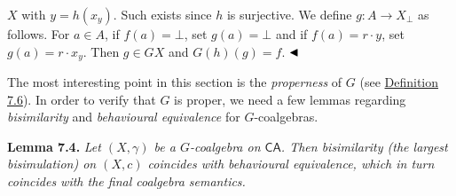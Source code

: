 \hypertarget{html:S7.SS0.SSS0.P0.SPx2.p2.m4}{}\({X}\) with %
\hypertarget{html:S7.SS0.SSS0.P0.SPx2.p2.m5}{}\({y=h(x_{y})}\). Such exists since %
\hypertarget{html:S7.SS0.SSS0.P0.SPx2.p2.m6}{}\({h}\) is surjective. We define %
\hypertarget{html:S7.SS0.SSS0.P0.SPx2.p2.m7}{}\({g\colon A\to X_{\bot}}\) as follows. For %
\hypertarget{html:S7.SS0.SSS0.P0.SPx2.p2.m8}{}\({a\in A}\), if %
\hypertarget{html:S7.SS0.SSS0.P0.SPx2.p2.m9}{}\({f(a)=\bot}\), set %
\hypertarget{html:S7.SS0.SSS0.P0.SPx2.p2.m10}{}\({g(a)=\bot}\) and if %
\hypertarget{html:S7.SS0.SSS0.P0.SPx2.p2.m11}{}\({f(a)=r\cdot y}\), set %
\hypertarget{html:S7.SS0.SSS0.P0.SPx2.p2.m12}{}\({g(a)=r\cdot x_{y}}\). Then %
\hypertarget{html:S7.SS0.SSS0.P0.SPx2.p2.m13}{}\({g\in GX}\) and %
\hypertarget{html:S7.SS0.SSS0.P0.SPx2.p2.m14}{}\({G(h)(g)=f}\). %
\hypertarget{html:S7.SS0.SSS0.P0.SPx2.p2.m15}{}\({\hfill\blacktriangleleft}\)
\par\medskip
\hypertarget{html:S7.SS0.SSS0.P0.SPx2.p3}{} The most interesting point in this section is the \emph{properness} of %
\hypertarget{html:S7.SS0.SSS0.P0.SPx2.p3.m1}{}\({G}\) (see \hyperlink{html:S7.Thmtheorem6}{Definition 7.6}). In order to verify that %
\hypertarget{html:S7.SS0.SSS0.P0.SPx2.p3.m2}{}\({G}\) is proper, we need a few lemmas regarding \emph{bisimilarity} and \emph{behavioural equivalence} for %
\hypertarget{html:S7.SS0.SSS0.P0.SPx2.p3.m3}{}\({G}\)-coalgebras.
\par\medskip
\hypertarget{html:S7.Thmtheorem4}{} \par\noindent\textbf{\textbf{Lemma 7.4}\textbf{.}}\quad  %
\hypertarget{html:S7.Thmtheorem4.p1}{} \emph{Let %
\hypertarget{html:S7.Thmtheorem4.p1.m1}{}\({(X,\gamma)}\) be a %
\hypertarget{html:S7.Thmtheorem4.p1.m2}{}\({G}\)-coalgebra on %
\hypertarget{html:S7.Thmtheorem4.p1.m3}{}\({\mathsf{CA}}\). Then bisimilarity (the largest bisimulation) on %
\hypertarget{html:S7.Thmtheorem4.p1.m4}{}\({(X,c)}\) coincides with behavioural equivalence, which in turn coincides with the final coalgebra semantics.}
